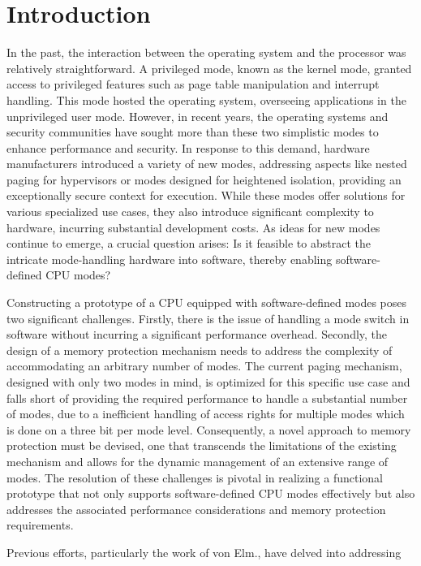 \chapter{Introduction}
In the past, the interaction between the operating system and the processor was
relatively straightforward. A privileged mode, known as the kernel mode, granted
access to privileged features such as page table manipulation and interrupt
handling. This mode hosted the operating system, overseeing applications in the
unprivileged user mode. However, in recent years, the operating systems and
security communities have sought more than these two simplistic modes to enhance
performance and security. In response to this demand, hardware manufacturers introduced a variety of
new modes, addressing aspects like nested paging for hypervisors or modes
designed for heightened isolation, providing an exceptionally secure context for
execution. While these modes offer solutions for various specialized use cases,
they also introduce significant complexity to hardware, incurring substantial
development costs. As ideas for new modes continue to emerge, a crucial question
arises: Is it feasible to abstract the intricate mode-handling hardware into
software, thereby enabling software-defined CPU modes?\par 
Constructing a prototype of a CPU equipped with software-defined modes poses two
significant challenges. Firstly, there is the issue of handling a mode switch in
software without incurring a significant performance overhead. Secondly, the design of
a memory protection mechanism needs to address the complexity of accommodating
an arbitrary number of modes. The current paging mechanism, designed with only two
modes in mind, is optimized for this specific use case and falls short of
providing the required performance to handle a substantial number of modes, due
to a inefficient handling of access rights for multiple modes which is done on a
three bit per mode level. Consequently, a novel approach to memory protection
must be devised, one that transcends the limitations of the existing mechanism and allows for the dynamic
management of an extensive range of modes. The resolution of these challenges is
pivotal in realizing a functional prototype that not only supports
software-defined CPU modes effectively but also addresses the associated
performance considerations and memory protection requirements.\par
Previous efforts, particularly the work of von Elm.\cite{Cve}, have delved into addressing
